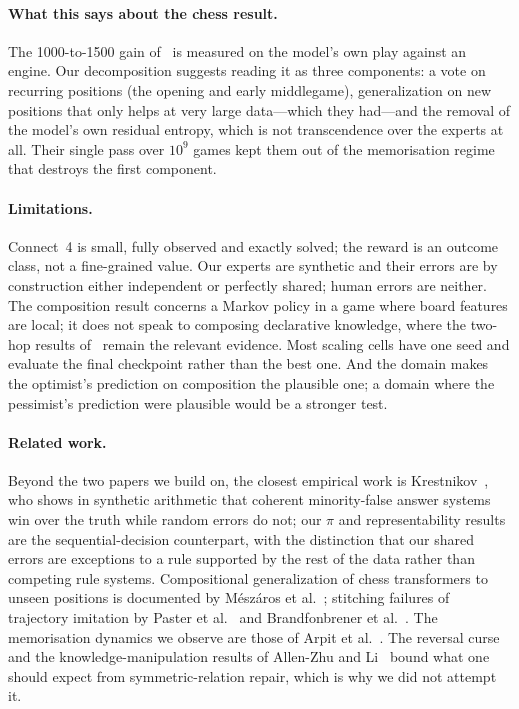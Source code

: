 \documentclass[11pt]{article}
\begin{document}
\paragraph{What this says about the chess result.} The 1000-to-1500 gain of~\cite{zhang2024transcendence} is measured on the model's own play against an engine. Our decomposition suggests reading it as three components: a vote on recurring positions (the opening and early middlegame), generalization on new positions that only helps at very large data---which they had---and the removal of the model's own residual entropy, which is not transcendence over the experts at all. Their single pass over $10^9$ games kept them out of the memorisation regime that destroys the first component.

\paragraph{Limitations.} Connect~4 is small, fully observed and exactly solved; the reward is an outcome class, not a fine-grained value. Our experts are synthetic and their errors are by construction either independent or perfectly shared; human errors are neither. The composition result concerns a Markov policy in a game where board features are local; it does not speak to composing declarative knowledge, where the two-hop results of~\cite{abreu2025taxonomy} remain the relevant evidence. Most scaling cells have one seed and evaluate the final checkpoint rather than the best one. And the domain makes the optimist's prediction on composition the plausible one; a domain where the pessimist's prediction were plausible would be a stronger test.

\paragraph{Related work.} Beyond the two papers we build on, the closest empirical work is Krestnikov~\cite{krestnikov2026}, who shows in synthetic arithmetic that coherent minority-false answer systems win over the truth while random errors do not; our $\pi$ and representability results are the sequential-decision counterpart, with the distinction that our shared errors are exceptions to a rule supported by the rest of the data rather than competing rule systems. Compositional generalization of chess transformers to unseen positions is documented by M\'esz\'aros et al.~\cite{meszaros2025}; stitching failures of trajectory imitation by Paster et al.~\cite{paster2022} and Brandfonbrener et al.~\cite{brandfonbrener2022}. The memorisation dynamics we observe are those of Arpit et al.~\cite{arpit2017}. The reversal curse~\cite{berglund2023} and the knowledge-manipulation results of Allen-Zhu and Li~\cite{allenzhu2023} bound what one should expect from symmetric-relation repair, which is why we did not attempt it.
\end{document}
